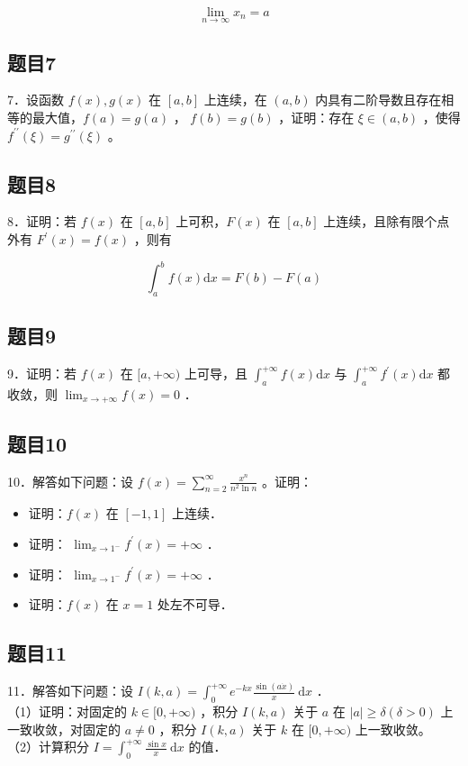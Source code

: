 \documentclass{article}
\begin{document}
\[
\lim _{n \rightarrow \infty} x_{n}=a
\]

\subsection{题目7}
7．设函数 \(f(x), g(x)\) 在 \([a, b]\) 上连续，在 \((a, b)\) 内具有二阶导数且存在相等的最大值，\(f(a)=g(a)\) ， \(f(b)=g(b)\) ，证明：存在 \(\xi \in(a, b)\) ，使得 \(f^{\prime \prime}(\xi)=g^{\prime \prime}(\xi)\) 。

\subsection{题目8}
8．证明：若 \(f(x)\) 在 \([a, b]\) 上可积，\(F(x)\) 在 \([a, b]\) 上连续，且除有限个点外有 \(F^{\prime}(x)=f(x)\) ，则有

\[
\int_{a}^{b} f(x) \mathrm{d} x=F(b)-F(a)
\]

\subsection{题目9}
9．证明：若 \(f(x)\) 在 \([a,+\infty)\) 上可导，且 \(\int_{a}^{+\infty} f(x) \mathrm{d} x\) 与 \(\int_{a}^{+\infty} f^{\prime}(x) \mathrm{d} x\) 都收敛，则 \(\lim _{x \rightarrow+\infty} f(x)=0\) ．

\subsection{题目10}
10．解答如下问题：设 \(f(x)=\sum_{n=2}^{\infty} \frac{x^{n}}{n^{2} \ln n}\) 。证明：

\begin{itemize}
  \item[（1）] 证明：\(f(x)\) 在 \([-1,1]\) 上连续．
  \item[（2）] 证明： \(\lim _{x \rightarrow 1^{-}} f^{\prime}(x)=+\infty\) ．
  \item[（3）] 证明： \(\lim _{x \rightarrow 1^{-}} f^{\prime}(x)=+\infty\) ．
  \item[（4）] 证明：\(f(x)\) 在 \(x=1\) 处左不可导．
\end{itemize}

\subsection{题目11}
11．解答如下问题：设 \(I(k, a)=\int_{0}^{+\infty} e^{-k x} \frac{\sin (a \dot{x})}{x} \mathrm{~d} x\) ．\\
（1）证明：对固定的 \(k \in[0,+\infty)\) ，积分 \(I(k, a)\) 关于 \(a\) 在 \(|a| \geq \delta(\delta>0)\) 上一致收敛，对固定的 \(a \neq 0\) ，积分 \(I(k, a)\) 关于 \(k\) 在 \([0,+\infty)\) 上一致收敛。\\
（2）计算积分 \(I=\int_{0}^{+\infty} \frac{\sin x}{x} \mathrm{~d} x\) 的值．
\end{document}

